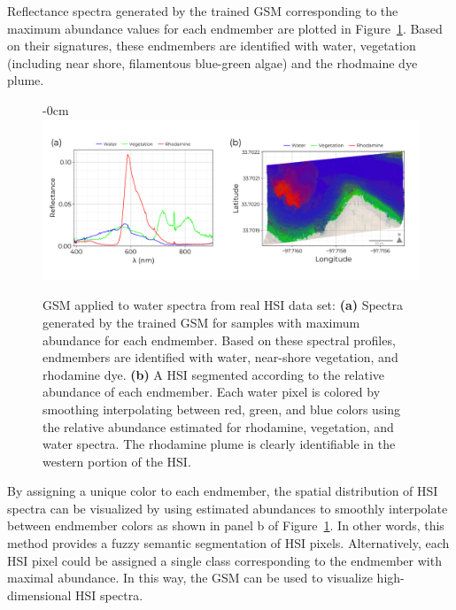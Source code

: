 \documentclass[remotesensing,article,submit,pdftex,moreauthors]{Definitions/mdpi}
\begin{document}
Reflectance spectra generated by the trained GSM corresponding to the maximum abundance values for each endmember are plotted in Figure~\ref{fig:robot-team-endmembers}. Based on their signatures, these endmembers are identified with water, vegetation (including near shore, filamentous blue-green algae) and the rhodmaine dye plume.

\begin{figure}[H]
\begin{adjustwidth}{-\extralength}{0cm}
\centering
\includegraphics[width=1.25\columnwidth]{results/robot-team/extracted-endmembers.pdf}
\end{adjustwidth}
\caption{GSM applied to water spectra from real HSI data set: \textbf{(a)} Spectra generated by the trained GSM for samples with maximum abundance for each endmember. Based on these spectral profiles, endmembers are identified with water, near-shore vegetation, and rhodamine dye. \textbf{(b)} A HSI segmented according to the relative abundance of each endmember. Each water pixel is colored by smoothing interpolating between red, green, and blue colors using the relative abundance estimated for rhodamine, vegetation, and water spectra. The rhodamine plume is clearly identifiable in the western portion of the HSI.}
\label{fig:robot-team-endmembers}
\end{figure}  

By assigning a unique color to each endmember, the spatial distribution of HSI spectra can be visualized by using estimated abundances to smoothly interpolate between endmember colors as shown in panel b of Figure~\ref{fig:robot-team-endmembers}. In other words, this method provides a fuzzy semantic segmentation of HSI pixels. Alternatively, each HSI pixel could be assigned a single class corresponding to the endmember with maximal abundance. In this way, the GSM can be used to visualize high-dimensional HSI spectra.
\end{document}
